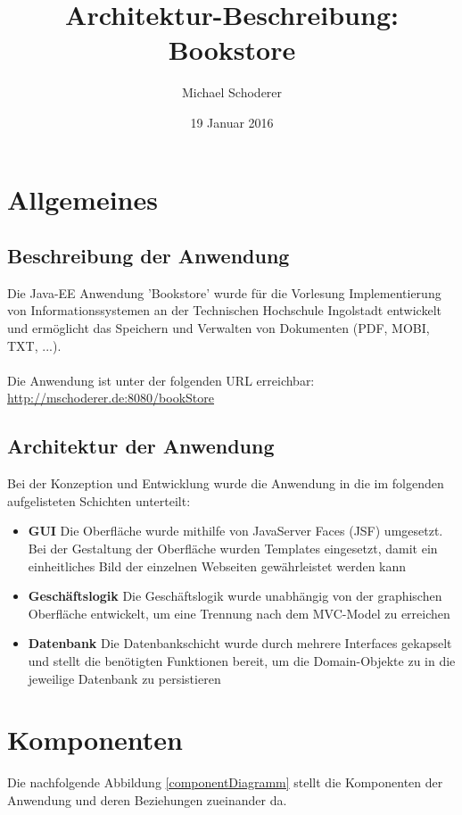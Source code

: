 \documentclass[12pt,a4paper]{book}
\author{Michael Schoderer}
\title{Architektur-Beschreibung: Bookstore}
\date{19 Januar 2016}
\begin{document}
	\maketitle	
	\begin{minipage}{\textwidth}
		\vfill
		\tableofcontents
			\listoffigures
	\end{minipage}

	
	
	
	\chapter{Allgemeines}
	\section{Beschreibung der Anwendung}
	Die Java-EE Anwendung 'Bookstore' wurde für die Vorlesung Implementierung von Informationssystemen an der Technischen Hochschule Ingolstadt entwickelt und ermöglicht das Speichern und Verwalten von Dokumenten (PDF, MOBI, TXT, ...).\\
	\\
	Die Anwendung ist unter der folgenden URL erreichbar: \url{http://mschoderer.de:8080/bookStore}
	
	\section{Architektur der Anwendung}
	Bei der Konzeption und Entwicklung wurde die Anwendung in die im folgenden aufgelisteten Schichten unterteilt:
	\begin{itemize}
		\item \textbf{GUI} Die Oberfläche wurde mithilfe von JavaServer Faces (JSF) umgesetzt. Bei der Gestaltung der Oberfläche wurden Templates eingesetzt, damit ein einheitliches Bild der einzelnen Webseiten gewährleistet werden kann
		\item \textbf{Geschäftslogik} Die Geschäftslogik wurde unabhängig von der graphischen Oberfläche entwickelt, um eine Trennung nach dem MVC-Model zu erreichen
		\item \textbf{Datenbank} Die Datenbankschicht wurde durch mehrere Interfaces gekapselt und stellt die benötigten Funktionen bereit, um die Domain-Objekte zu in die jeweilige Datenbank zu persistieren		
		\end{itemize}	
		
		\let\cleardoublepage\clearpage
	\chapter{Komponenten}
	Die nachfolgende Abbildung \ref{componentDiagramm} stellt die Komponenten der Anwendung und deren Beziehungen zueinander da.
	
\end{document}
